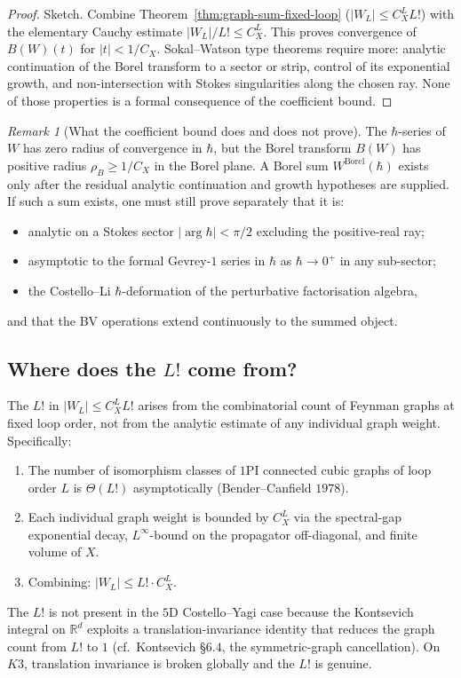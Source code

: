 \documentclass[11pt]{article}
\providecommand{\R}{\mathbb{R}}
\theoremstyle{definition}\newtheorem{definition}[theorem]{Definition}
\theoremstyle{remark}\newtheorem{remark}[theorem]{Remark}\newtheorem{example}[theorem]{Example}
\begin{document}
\begin{proof}
Sketch. Combine Theorem~\ref{thm:graph-sum-fixed-loop}
($|W_L|\leq C_X^L L!$) with the elementary Cauchy estimate
$|W_L|/L!\leq C_X^L$. This proves convergence of
$B(W)(t)$ for $|t|<1/C_X$. Sokal--Watson type theorems require more:
analytic continuation of the Borel transform to a sector or strip,
control of its exponential growth, and non-intersection with Stokes
singularities along the chosen ray. None of those properties is a
formal consequence of the coefficient bound.
\end{proof}

\begin{remark}[What the coefficient bound does and does not prove]
The $\hbar$-series of $W$ has zero radius of convergence in $\hbar$,
but the Borel transform $B(W)$ has positive radius
$\rho_B \geq 1/C_X$ in the Borel plane. A Borel sum
$W^{\mathrm{Borel}}(\hbar)$ exists only after the residual analytic
continuation and growth hypotheses are supplied. If such a sum exists,
one must still prove separately that it is:
\begin{itemize}\itemsep0pt
\item analytic on a Stokes sector $|\arg\hbar|<\pi/2$ excluding the
positive-real ray;
\item asymptotic to the formal Gevrey-$1$ series in $\hbar$ as
$\hbar\to 0^+$ in any sub-sector;
\item the Costello--Li $\hbar$-deformation of the perturbative
factorisation algebra,
\end{itemize}
and that the BV operations extend continuously to the summed object.
\end{remark}

\subsection{Where does the $L!$ come from?}

The $L!$ in $|W_L|\leq C_X^L L!$ arises from the combinatorial count
of Feynman graphs at fixed loop order, not from the analytic estimate
of any individual graph weight. Specifically:
\begin{enumerate}[label=(\alph*)]
\item The number of isomorphism classes of $1$PI connected cubic
graphs of loop order $L$ is $\Theta(L!)$ asymptotically (Bender--Canfield
$1978$).
\item Each individual graph weight is bounded by $C_X^L$ via the
spectral-gap exponential decay, $L^\infty$-bound on the propagator
off-diagonal, and finite volume of $X$.
\item Combining: $|W_L|\leq L!\cdot C_X^L$.
\end{enumerate}
The $L!$ is not present in the $5$D Costello--Yagi case because the
Kontsevich integral on $\R^d$ exploits a translation-invariance
identity that reduces the graph count from $L!$ to $1$ (cf.~Kontsevich
\S$6.4$, the symmetric-graph cancellation). On $K3$, translation
invariance is broken globally and the $L!$ is genuine.
\end{document}
